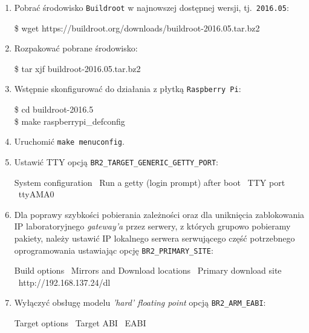 \documentclass{article}
\newcommand{\buildrootver}{2016.05}
\newenvironment{ttblock}{\ttfamily}{\par}
\begin{document}
\begin{enumerate}
\item Pobrać środowisko \texttt{Buildroot} w najnowszej dostępnej wersji, tj.~\texttt{\buildrootver}:

\begin{ttblock}
\$ wget https://buildroot.org/downloads/buildroot-\buildrootver.tar.bz2
\end{ttblock}

\item Rozpakować pobrane środowisko:

\begin{ttblock}
\$ tar xjf buildroot-\buildrootver.tar.bz2
\end{ttblock}

\item Wstępnie skonfigurować do działania z płytką \texttt{Raspberry~Pi}:

\begin{ttblock}
\$ cd buildroot-2016.5\\
\$ make raspberrypi\_defconfig
\end{ttblock}

\item Uruchomić \texttt{make menuconfig}.

\item Ustawić TTY opcją \texttt{BR2\_TARGET\_GENERIC\_GETTY\_PORT}:

\begin{ttblock}
System configuration \textrightarrow\ Run a getty (login prompt) after boot \textrightarrow\ TTY port \textrightarrow\ ttyAMA0
\end{ttblock}

\item Dla poprawy szybkości pobierania zależności oraz dla uniknięcia zablokowania IP laboratoryjnego \emph{gateway'a} przez serwery, z których grupowo pobieramy pakiety, należy ustawić IP lokalnego serwera serwującego część potrzebnego oprogramowania ustawiając opcję \texttt{BR2\_PRIMARY\_SITE}:

\begin{ttblock}
Build options \textrightarrow\ Mirrors and Download locations \textrightarrow\ Primary download site \textrightarrow\ http://192.168.137.24/dl
\end{ttblock}

\item Wyłączyć obsługę modelu \emph{'hard' floating point} opcją \texttt{BR2\_ARM\_EABI}:

\begin{ttblock}
Target options \textrightarrow\ Target ABI \textrightarrow\ EABI
\end{ttblock}


\end{enumerate}
\end{document}
